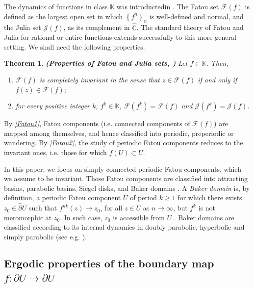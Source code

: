 \documentclass[11pt]{article}
\newtheorem{thm}{Theorem}[section]
\theoremstyle{definition}
\theoremstyle{remark}
\newcounter{main}
\theoremstyle{plain}
\begin{document}
The dynamics of functions in class $ \mathbb{K} $ was introductedin \cite{Bolsch-thesis, BakerDominguezHerring}. The Fatou set $ \mathcal{F}(f) $ is defined as the largest open set in which $ \left\lbrace f^n\right\rbrace _n $ is well-defined and normal, and the Julia set $ \mathcal{J}(f) $, as its complement in $ \widehat{\mathbb{C}} $. The standard theory of Fatou and Julia for rational or entire functions extends successfully to this more general setting. We shall need the following properties.

\begin{thm}{\bf (Properties of Fatou and Julia sets, {\normalfont \cite[Thm. A]{BakerDominguezHerring}})}
	Let $ f\in\mathbb{K} $. Then,
	\begin{enumerate}[label={\em (\alph*)}]
		\item\label{Fatou1} $ \mathcal{F}(f) $ is completely invariant in the sense that $ z\in\mathcal{F}(f) $ if and only if $ f(z)\in \mathcal{F}(f) $;
		\item\label{Fatou2} for every positive integer $ k $, $ f^k\in\mathbb{K} $, $ \mathcal{F}(f^k)=\mathcal{F}(f) $ and $ \mathcal{J}(f^k)=\mathcal{J}(f) $.
	\end{enumerate}
\end{thm}

By {\em\ref{Fatou1}}, Fatou components (i.e. connected components of $ \mathcal{F}(f) $) are mapped among themselves, and hence classified into periodic, preperiodic or wandering. By {\em\ref{Fatou2}}, the study of periodic Fatou components reduces to the invariant ones, i.e. those for which $ f(U)\subset U $. 


In this paper, we focus on simply connected periodic Fatou components, which we assume to be invariant. 
Those Fatou components are classified into attracting basins, parabolic basins, Siegel disks,  and Baker domains \cite[Thm. C]{BakerDominguezHerring}. A \textit{Baker domain} is, by definition, a periodic Fatou component $ U $ of period $ k\geq 1 $ for which there exists $ z_0\in\widehat{\partial} U$ such that $ f^{nk}(z)\to z_0 $, for all $ z\in U $ as $ n\to\infty $, but $ f^k $ is not meromorphic at $ z_0 $. In such case, $ z_0 $ is accessible from $ U $  \cite[658]{BakerDominguezHerring}. Baker domains are classified according to its internal dynamics in doubly parabolic, hyperbolic and simply parabolic (see e.g. \cite{fh}). 







\subsection*{Ergodic properties of the boundary map $ f\colon \partial U\to \partial U $}\label{subsection-ergodic-f}
\end{document}
